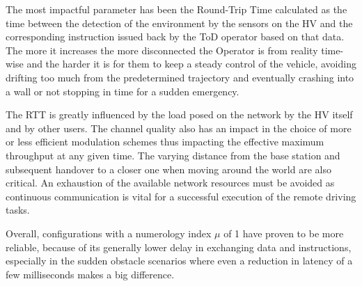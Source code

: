 The most impactful parameter has been the Round-Trip Time calculated as the time between the detection of the environment by the sensors on the HV and the corresponding instruction issued back by the ToD operator based on that data. The more it increases the more disconnected the Operator is from reality time-wise and the harder it is for them to keep a steady control of the vehicle, avoiding drifting too much from the predetermined trajectory and eventually crashing into a wall or not stopping in time for a sudden emergency.

The RTT is greatly influenced by the load posed on the network by the HV itself and by other users. The channel quality also has an impact in the choice of more or less efficient modulation schemes thus impacting the effective maximum throughput at any given time. The varying distance from the base station and subsequent handover to a closer one when moving around the world are also critical. An exhaustion of the available network resources must be avoided as continuous communication is vital for a successful execution of the remote driving tasks.

Overall, configurations with a numerology index $\mu$ of 1 have proven to be more reliable, because of its generally lower delay in exchanging data and instructions, especially in the sudden obstacle scenarios where even a reduction in latency of a few milliseconds makes a big difference.